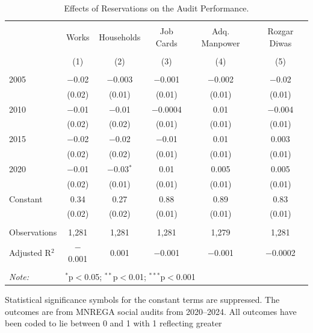 \begin{table}[!htbp]
\centering
\begin{threeparttable}

  \caption{Effects of Reservations on the Audit Performance.} 
  \label{main_mnrega_audit_res} 
\scriptsize 
\begin{tabular}{@{\extracolsep{0pt}}lccccc} 
\\[-1.8ex]\hline 
\hline \\[-1.8ex] 
 & Works & Households & Job Cards & Adq. Manpower & Rozgar Diwas \\ 
\\[-1.8ex] & (1) & (2) & (3) & (4) & (5)\\ 
\hline \\[-1.8ex] 
 2005 & $-$0.02 & $-$0.003 & $-$0.001 & $-$0.002 & $-$0.02 \\ 
  & (0.02) & (0.01) & (0.01) & (0.01) & (0.01) \\ 
  2010 & $-$0.01 & $-$0.01 & $-$0.0004 & 0.01 & $-$0.004 \\ 
  & (0.02) & (0.02) & (0.01) & (0.01) & (0.01) \\ 
  2015 & $-$0.02 & $-$0.02 & $-$0.01 & 0.01 & 0.003 \\ 
  & (0.02) & (0.02) & (0.01) & (0.01) & (0.01) \\ 
  2020 & $-$0.01 & $-$0.03$^{*}$ & 0.01 & 0.005 & 0.005 \\ 
  & (0.02) & (0.01) & (0.01) & (0.01) & (0.01) \\ 
  Constant & 0.34 & 0.27 & 0.88 & 0.89 & 0.83 \\ 
  & (0.02) & (0.02) & (0.01) & (0.01) & (0.01) \\ 
 \hline \\[-1.8ex] 
Observations & 1,281 & 1,281 & 1,281 & 1,279 & 1,281 \\ 
Adjusted R$^{2}$ & $-$0.001 & 0.001 & $-$0.001 & $-$0.001 & $-$0.0002 \\ 
\hline 
\hline \\[-1.8ex] 
\textit{Note:}  & \multicolumn{5}{l}{$^{*}$p$<$0.05; $^{**}$p$<$0.01; $^{***}$p$<$0.001} \\ 
\end{tabular} 
\begin{tablenotes}[flushleft]
\scriptsize
\item[] Statistical significance symbols for the constant terms are suppressed. The outcomes are from MNREGA social audits from 2020--2024.
                                        All outcomes have been coded to lie between 0 and 1 with 1 reflecting greater 

\end{tablenotes}
\end{threeparttable}
\end{table}
